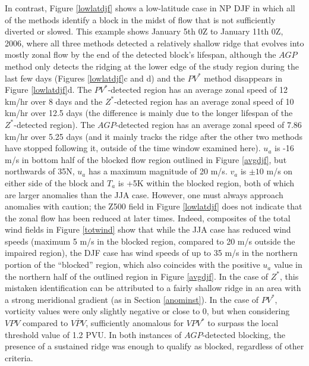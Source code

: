 \documentclass[smallextended]{svjour3}       %
\numberwithin{equation}{section}
\begin{document}
In contrast, Figure \ref{lowlatdjf} shows a low-latitude case in NP DJF in which all of the methods identify a block in the midst of flow that is not sufficiently diverted or slowed. This example shows January 5th 0Z to January 11th 0Z, 2006, where all three methods detected a relatively shallow ridge that evolves into mostly zonal flow by the end of the detected block's lifespan, although the $AGP$ method only detects the ridging at the lower edge of the study region during the last few days (Figures \ref{lowlatdjf}c and d) and the $PV^*$ method disappears in Figure \ref{lowlatdjf}d. The $PV^*$-detected region has an average zonal speed of 12 km/hr over 8 days and the $Z^*$-detected region has an average zonal speed of 10 km/hr over 12.5 days (the difference is mainly due to the longer lifespan of the $Z^*$-detected region). The $AGP$-detected region has an average zonal speed of 7.86 km/hr over 5.25 days (and it mainly tracks the ridge after the other two methods have stopped following it, outside of the time window examined here). $u_a$ is -16 m/s in bottom half of the blocked flow region outlined in Figure \ref{avgdjf}, but northwards of 35N, $u_a$ has a maximum magnitude of 20 m/s. $v_a$ is $\pm 10$ m/s on either side of the block and $T_a$ is +5K within the blocked region, both of which are larger anomalies than the JJA case. However, one must always approach anomalies with caution; the Z500 field in Figure \ref{lowlatdjf} does not indicate that the zonal flow has been reduced at later times. Indeed, composites of the total wind fields in Figure \ref{totwind} show that while the JJA case has reduced wind speeds (maximum 5 m/s in the blocked region, compared to 20 m/s outside the impaired region), the DJF case has wind speeds of up to 35 m/s in the northern portion of the ``blocked'' region, which also coincides with the positive $u_a$ value in the northern half of the outlined region in Figure \ref{avgdjf}. In the case of $Z^*$, this mistaken identification can be attributed to a fairly shallow ridge in an area with a strong meridional gradient (as in Section \ref{anominst}). In the case of $PV^*$, vorticity values were only slightly negative or close to 0, but when considering $VPV$ compared to $\overline{VPV}$, sufficiently anomalous for $VPV^*$ to surpass the local threshold value of 1.2 PVU. In both instances of $AGP$-detected blocking, the presence of a sustained ridge was enough to qualify as blocked, regardless of other criteria. 
\end{document}
